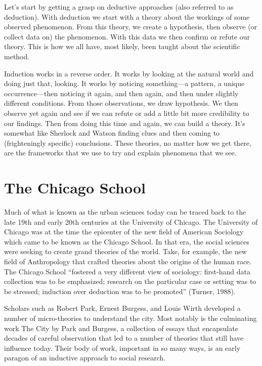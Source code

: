 \documentclass[
]{book}
\begin{document}
Let's start by getting a grasp on deductive approaches (also referred to as deduction). With deduction we start with a theory about the workings of some observed phenomenon. From this theory, we create a hypothesis, then observe (or collect data on) the phenomenon. With this data we then confirm or refute our theory. This is how we all have, most likely, been taught about the scientific method.

Induction works in a reverse order. It works by looking at the natural world and doing just that, looking. It works by noticing something---a pattern, a unique occurrence---then noticing it again, and then again, and then under slightly different conditions. From those observations, we draw hypothesis. We then observe yet again and see if we can refute or add a little bit more credibility to our findings. Then from doing this time and again, we can build a theory. It's somewhat like Sherlock and Watson finding clues and then coming to (frighteningly specific) conclusions. These theories, no matter how we get there, are the frameworks that we use to try and explain phenomena that we see.

\hypertarget{the-chicago-school}{%
\section{The Chicago School}\label{the-chicago-school}}

Much of what is known as the urban sciences today can be traced back to the late 19th and early 20th centuries at the University of Chicago. The University of Chicago was at the time the epicenter of the new field of American Sociology which came to be known as the Chicago School. In that era, the social sciences were seeking to create grand theories of the world. Take, for example, the new field of Anthropology that crafted theories about the origins of the human race. The Chicago School ``fostered a very different view of sociology: first-hand data collection was to be emphasized; research on the particular case or setting was to be stressed; induction over deduction was to be promoted'' (Turner, 1988).

Scholars such as Robert Park, Ernest Burgess, and Louis Wirth developed a number of micro-theories to understand the city. Most notably is the culminating work The City by Park and Burgess, a collection of essays that encapsulate decades of careful observation that led to a number of theories that still have influence today. Their body of work, important in so many ways, is an early paragon of an inductive approach to social research.
\end{document}
